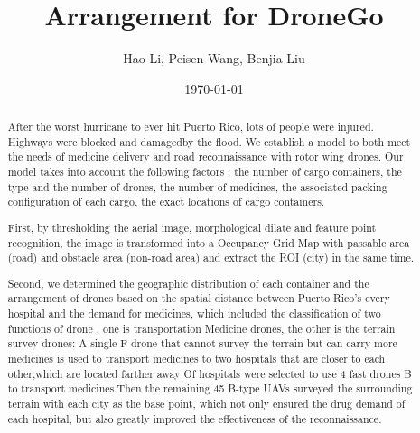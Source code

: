 \documentclass{article} %
\title{Arrangement for DroneGo}  %
\author{Hao Li, Peisen Wang, Benjia Liu}   %
\date{\today}       %
\begin{document}
\maketitle

\begin{abstract}

After the worst hurricane to ever hit Puerto Rico, lots of people were injured. Highways were blocked and damagedby the flood.
We establish a model to both meet the needs of medicine delivery and road reconnaissance with rotor wing drones.
Our model takes into account the following factors :  the number of cargo containers, the type and the number of drones, 
the number of medicines,  the associated packing configuration of each cargo, the exact locations of cargo containers.

First, by thresholding the aerial image, morphological dilate and feature point recognition, the image is transformed 
into a Occupancy Grid Map with passable area (road) and obstacle area (non-road area) and extract the ROI (city) in the same time.

Second, we determined the geographic distribution of each container and the arrangement of drones based on the spatial distance between Puerto Rico's every hospital and the demand for medicines, which included the classification of two functions of drone , one is transportation Medicine drones, the other is the terrain survey drones: A single F drone that cannot survey the terrain but can carry more medicines is used to transport medicines to two hospitals that are closer to each other,which are located farther away Of hospitals were selected to use 4 fast drones B to transport medicines.Then the remaining 45 B-type UAVs surveyed the surrounding terrain with each city as the base point, which not only ensured the drug demand of each hospital, but also greatly improved the effectiveness of the reconnaissance.


\end{abstract}
\end{document}
